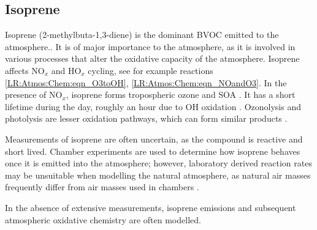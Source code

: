   \subsection{Isoprene}
  \label{LR:VOCs:Isop}
    Isoprene (2-methylbuta-1,3-diene) is the dominant BVOC emitted to the 
    atmosphere.. 
    It is of major importance to the atmosphere, as it is involved in various processes that alter the oxidative capacity of the atmosphere.
    Isoprene affects NO$_x$ and HO$_x$ cycling, see for example reactions 
    \ref{LR:Atmos:Chem:eqn_O3toOH}, \ref{LR:Atmos:Chem:eqn_NOandO3}.
    In the presence of NO$_x$, isoprene forms tropospheric ozone and SOA 
    \parencite{Wagner2002, Millet2006}.
    It has a short lifetime during the day, roughly an hour due to OH oxidation 
    \parencite{AtkinsonArey2003}.
    Ozonolysis and photolysis are lesser oxidation pathways, which can form 
    similar products \parencite{Nguyen2016, Wolfe2016}.
    
    Measurements of isoprene are often uncertain, as the compound is reactive and short lived.
    Chamber experiments are used to determine how isoprene behaves once it is emitted into the atmosphere; however, laboratory derived reaction rates may be unsuitable when modelling the natural atmosphere, as natural air masses frequently differ from air masses used in chambers \parencite{Kanakidou2005, Nguyen2014}.
    
    In the absence of extensive measurements, isoprene emissions and subsequent 
    atmospheric oxidative chemistry are often modelled.
    
